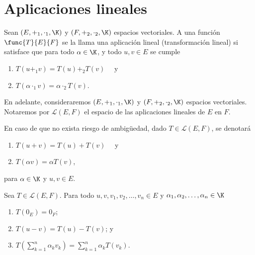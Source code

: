 \documentclass[a4,11pt]{aleph-notas}
\begin{document}
\encabezado

\section{Aplicaciones lineales}

\begin{defi}
    Sean $(E,+_1,\cdot_1,\K)$ y $(F,+_2,\cdot_2,\K)$ espacios vectoriales. A una función $\func{T}{E}{F}$ se la llama una aplicación lineal (transformación lineal) si satisface que para todo $\alpha \in \K$, y todo $u,v \in E$ se cumple
    \begin{enumerate}
    \item 
        $T(u +_1 v) = T(u) +_2 T(v)\quad$ y
    \item 
        $T(\alpha \cdot_1 v ) = \alpha \cdot_2 T(v)$.
    \end{enumerate}
\end{defi}

En adelante, consideraremos $(E,+_1,\cdot_1,\K)$ y $(F,+_2,\cdot_2,\K)$ espacios vectoriales. Notaremos por $\mathcal{L}(E,F)$ el espacio de las aplicaciones lineales de $E$ en $F$.

\begin{advertencia}
    En caso de que no exista riesgo de ambigüedad, dado $T \in \mathcal{L}(E,F)$, se denotará
    \begin{enumerate}
    \item 
        $T(u + v) = T(u) + T(v)\quad$ y
    \item 
        $T(\alpha v ) = \alpha T(v)$,
    \end{enumerate}
    para $\alpha \in \K$ y $u,v \in E$.
\end{advertencia}
    
\begin{teo}
     Sea $T \in \mathcal{L}(E,F)$. Para todo $u,v, v_1, v_2, \ldots, v_n \in E$ y $\alpha_1, \alpha_2, \ldots, \alpha_n \in \K$
     \begin{enumerate}
         \item $T(0_E) = 0_F$;
         \item $T(u-v) = T(u) - T(v)$; y
         \item $T\left(\displaystyle \sum_{k=1}^n \alpha_k v_k \right)= 
         \displaystyle \sum_{k=1}^n \alpha_k T\left(v_k \right)$.
     \end{enumerate}
\end{teo}
\end{document}
